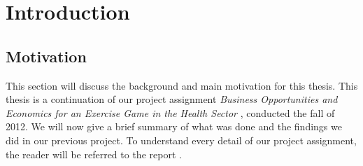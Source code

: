 \chapter{Introduction}

\section{Motivation}
This section will discuss the background and main motivation for this thesis. 
This thesis is a continuation of our project assignment \emph{Business Opportunities and Economics for an Exercise Game in the Health Sector} \cite{project}, conducted the fall of 2012. We will now give a brief summary of what was done and the findings we did in our previous project. To understand every detail of our project assignment, the reader will be referred to the report \cite{project}.   

